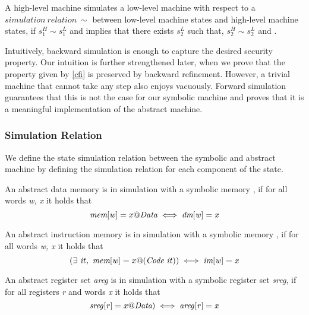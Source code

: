 \begin{definition}
\label{fwd_simulation_LH}
  A high-level machine simulates a low-level machine with respect to a
  $simulation~relation~\sim$ between low-level machine states and
  high-level machine states, if $s^H_1 \sim s_1^L$ and
   implies that there exists $s^L_2$ such that,
  $s^H_2 \sim s^L_2$ and .
\end{definition}

Intuitively, backward simulation is enough to capture the desired
security property. Our intuition is further strengthened later, when
we prove that the \CFI property given by \cref{cfi} is preserved by
backward refinement. However, a trivial machine that cannot take any step
also enjoys \CFI vacuously. Forward simulation guarantees that this is not
the case for our symbolic machine and proves that it is a meaningful
implementation of the abstract machine.

\subsubsection{Simulation Relation}
\label{sec:sim_relation}

We define the state simulation relation between the symbolic and
abstract machine by defining the simulation relation for each
component of the state.

\begin{definition}\label{refine_dmemory}
  An abstract data memory \dmem is in simulation with a
  symbolic memory \mem, if for all words \textit{w, x} it holds
  that
  $$\textit{mem}[\mathit{w}] = x@\textit{Data}
  \iff \textit{dm}[\mathit{w}] = \mathit{x}$$
\end{definition}

\begin{definition}
  \label{refine_imemory}
  An abstract instruction memory \imem is in simulation with a
  symbolic memory \mem, if for all words \textit{w, x} it holds
  that
  $$(\exists~\mathit{it}, ~ \textit{mem}[\mathit{w}] =
  x@(\textit{Code}~\mathit{it}))
  \iff \textit{im}[\mathit{w}] = \mathit{x}$$
\end{definition}

\begin{definition}
  \label{refine_registers}
  An abstract register set \textit{areg} is in simulation with a
  symbolic register set \textit{sreg}, if for all registers \textit{r} and words
  \textit{x} it holds that
  $$ \mathit{sreg}[\mathit{r}] = x@\textit{Data})
  \iff \mathit{areg}[\mathit{r}] = \mathit{x}$$
\end{definition}

